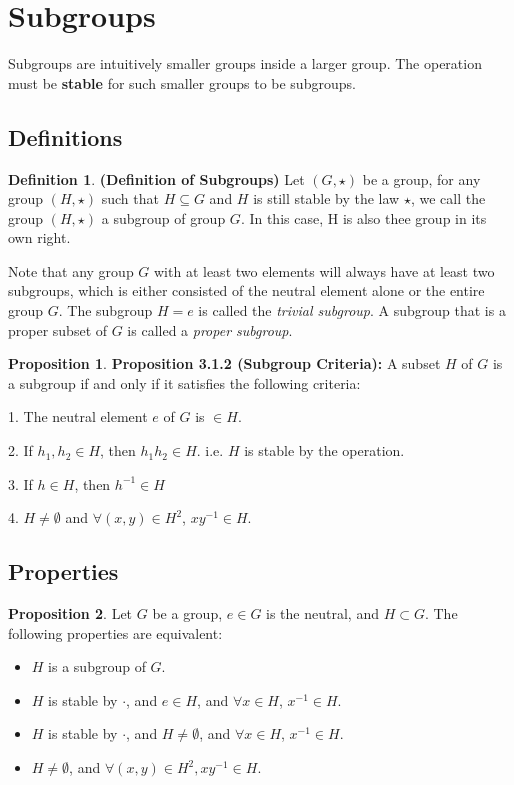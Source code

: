 \documentclass{article}
\theoremstyle{definition}
\newtheorem{defi}{Definition}[subsection]
\newtheorem{prop}{Proposition}[subsection]
\begin{document}
\section{Subgroups}

Subgroups are intuitively smaller groups inside a larger group. The operation must be \textbf{stable} for such smaller groups to be subgroups.

\subsection{Definitions}

\begin{defi}
\noindent\textbf{(Definition of Subgroups)} Let $(G, \star)$ be a group, for any group $(H, \star)$ such that $H \subseteq G$ and $H$ is still stable by the law $\star$, we call the group $(H, \star)$ a subgroup of group $G$. In this case, H is also thee group in its own right.

\end{defi}
Note that any group $G$ with at least two elements will always have at least two subgroups, which is either consisted of the neutral element alone or the entire group $G$. The subgroup $H={e}$ is called the \textit{trivial subgroup}. A subgroup that is a proper subset of $G$ is called a \textit{proper subgroup}.

\begin{prop}
\noindent\textbf{Proposition 3.1.2 (Subgroup Criteria):} A subset $H$ of $G$ is a subgroup if and only if it satisfies the following criteria:

1. The neutral element $e$ of $G$ is $\in H$.

2. If $h_1, h_2 \in H$, then $h_1h_2 \in H$. i.e. $H$ is stable by the operation.

3. If $h \in H$, then $h^{-1} \in H$

4. $H \neq \emptyset$ and $\forall(x,y)\in H^{2}$, $xy^{-1} \in H$.
\end{prop}

\subsection{Properties}

\begin{prop}
\label{fundamental_prop_subgroup}
Let $G$ be a group, $e\in G$ is the neutral, and $H\subset G$. The following properties are equivalent:
\begin{itemize}
    \item $H$ is a subgroup of $G$.
    \item $H$ is stable by $\cdot$, and $e\in H$, and $\forall x\in H$, $x^{-1}\in H$.
    \item $H$ is stable by $\cdot$, and $H \neq \emptyset$, and $\forall x\in H$, $x^{-1}\in H$.
    \item $H\neq \emptyset$, and $\forall (x,y)\in H^{2}, xy^{-1}\in H$.
\end{itemize}
\end{prop}
\end{document}
